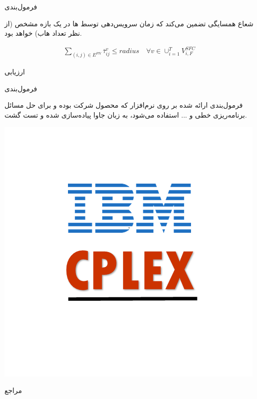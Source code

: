 \documentclass{beamer}
\begin{document}
\begin{persian}
\begin{frame}{فرمول‌بندی}
    \par
    شعاع همسایگی تضمین می‌کند که زمان سرویس‌دهی توسط
    ها
    در یک بازه مشخص (از نظر تعداد هاب)
    خواهد بود.
    \begin{latin}\begin{align}
        \sum_{(i, j) \in E^{PN}} \bar{\tau}_{ij}^{v} \le radius
        \quad
        \forall v \in \cup_{i=1}^T V_{i, F}^{SFC}
    \end{align}\end{latin}
\end{frame}
\begin{frame}{} %
    \begin{center}
        ارزیابی
    \end{center}
\end{frame}
\begin{frame}{فرمول‌بندی} %
    \par
    فرمول‌بندی ارائه شده بر روی نرم‌افزار
    که محصول شرکت  بوده و برای حل مسائل برنامه‌ریزی خطی و ...
    استفاده می‌شود،
    به زبان جاوا پیاده‌سازی شده
    و تست گشت.

    \begin{center}
        \includegraphics[scale=0.4]{images/ibm-cplex.png}
    \end{center}
\end{frame}

\begin{frame}[shrink=25]{مراجع} %
    \begin{latin}
    \printbibliography[heading=none]
    \end{latin}
\end{frame}
\end{persian}
\end{document}
